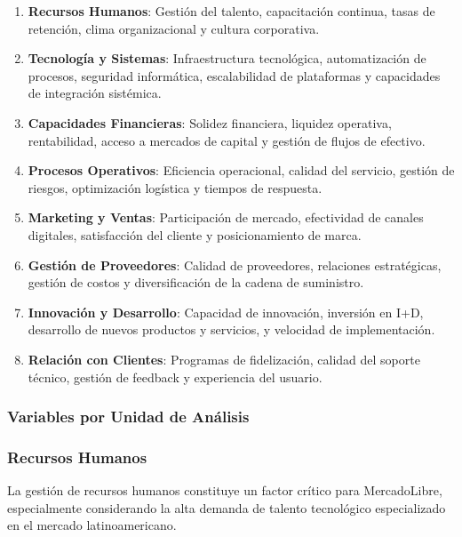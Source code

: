 \begin{enumerate}
\item \textbf{Recursos Humanos}: Gestión del talento, capacitación continua, tasas de retención, clima organizacional y cultura corporativa.

\item \textbf{Tecnología y Sistemas}: Infraestructura tecnológica, automatización de procesos, seguridad informática, escalabilidad de plataformas y capacidades de integración sistémica.

\item \textbf{Capacidades Financieras}: Solidez financiera, liquidez operativa, rentabilidad, acceso a mercados de capital y gestión de flujos de efectivo.

\item \textbf{Procesos Operativos}: Eficiencia operacional, calidad del servicio, gestión de riesgos, optimización logística y tiempos de respuesta.

\item \textbf{Marketing y Ventas}: Participación de mercado, efectividad de canales digitales, satisfacción del cliente y posicionamiento de marca.

\item \textbf{Gestión de Proveedores}: Calidad de proveedores, relaciones estratégicas, gestión de costos y diversificación de la cadena de suministro.

\item \textbf{Innovación y Desarrollo}: Capacidad de innovación, inversión en I+D, desarrollo de nuevos productos y servicios, y velocidad de implementación.

\item \textbf{Relación con Clientes}: Programas de fidelización, calidad del soporte técnico, gestión de feedback y experiencia del usuario.
\end{enumerate}

\subsubsection{Variables por Unidad de Análisis}

\subsubsection{Recursos Humanos}

La gestión de recursos humanos constituye un factor crítico para MercadoLibre, especialmente considerando la alta demanda de talento tecnológico especializado en el mercado latinoamericano.

